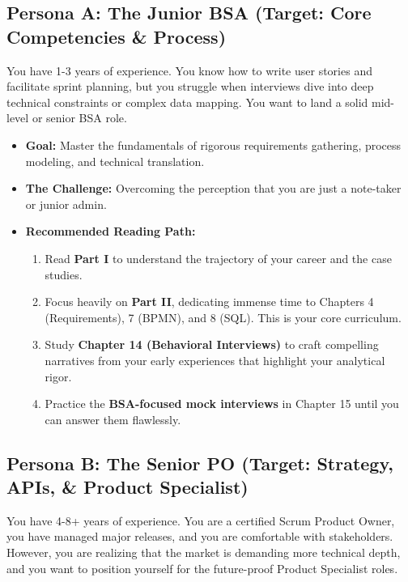 \subsection{Persona A: The Junior BSA (Target: Core Competencies \&
Process)}\label{persona-a-the-junior-bsa-target-core-competencies-process}

You have 1-3 years of experience. You know how to write user stories and
facilitate sprint planning, but you struggle when interviews dive into
deep technical constraints or complex data mapping. You want to land a
solid mid-level or senior BSA role.

\begin{itemize}
\tightlist
\item
  \textbf{Goal:} Master the fundamentals of rigorous requirements
  gathering, process modeling, and technical translation.
\item
  \textbf{The Challenge:} Overcoming the perception that you are just a
  note-taker or junior admin.
\item
  \textbf{Recommended Reading Path:}

  \begin{enumerate}
  \def\labelenumi{\arabic{enumi}.}
  \tightlist
  \item
    Read \textbf{Part I} to understand the trajectory of your career and
    the case studies.
  \item
    Focus heavily on \textbf{Part II}, dedicating immense time to
    Chapters 4 (Requirements), 7 (BPMN), and 8 (SQL). This is your core
    curriculum.
  \item
    Study \textbf{Chapter 14 (Behavioral Interviews)} to craft
    compelling narratives from your early experiences that highlight
    your analytical rigor.
  \item
    Practice the \textbf{BSA-focused mock interviews} in Chapter 15
    until you can answer them flawlessly.
  \end{enumerate}
\end{itemize}

\subsection{Persona B: The Senior PO (Target: Strategy, APIs, \& Product
Specialist)}\label{persona-b-the-senior-po-target-strategy-apis-product-specialist}

You have 4-8+ years of experience. You are a certified Scrum Product
Owner, you have managed major releases, and you are comfortable with
stakeholders. However, you are realizing that the market is demanding
more technical depth, and you want to position yourself for the
future-proof Product Specialist roles.

